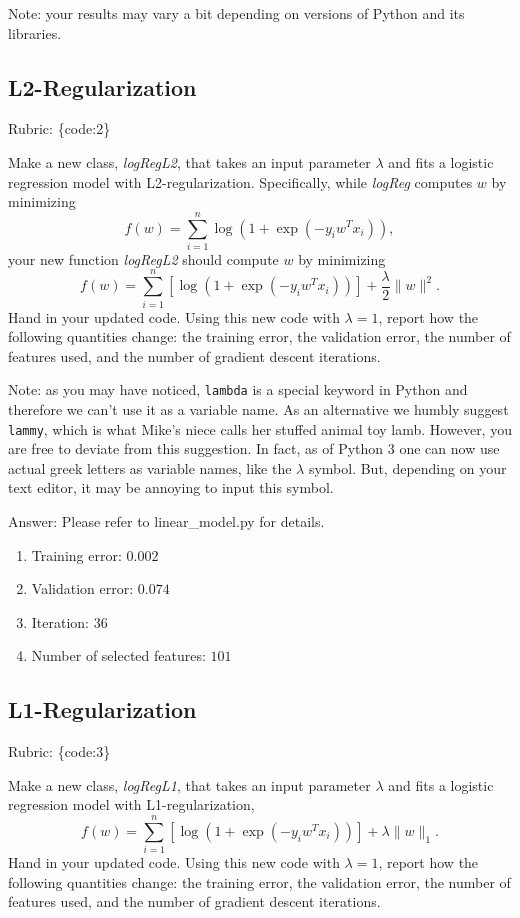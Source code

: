 \documentclass{article}
\def\rubric#1{\gre{Rubric: \{#1\}}}{}
\def\blu#1{{\color{blu}#1}}
\def\gre#1{{\color{gre}#1}}
\def\norm#1{\|#1\|}
\begin{document}
Note: your results may vary a bit depending on versions of Python and its libraries.


\subsection{L2-Regularization}
\rubric{code:2}

Make a new class, \emph{logRegL2}, that takes an input parameter $\lambda$ and fits a logistic regression model with L2-regularization. Specifically, while \emph{logReg} computes $w$ by minimizing
\[
f(w) = \sum_{i=1}^n \log(1+\exp(-y_iw^Tx_i)),
\]
your new function \emph{logRegL2} should compute $w$ by minimizing
\[
f(w) = \sum_{i=1}^n \left[\log(1+\exp(-y_iw^Tx_i))\right] + \frac{\lambda}{2}\norm{w}^2.
\]
\blu{Hand in your updated code. Using this new code with $\lambda = 1$, report how the following quantities change: the training error, the validation error, the number of features used, and the number of gradient descent iterations.}

Note: as you may have noticed, \texttt{lambda} is a special keyword in Python and therefore we can't use it as a variable name.
As an alternative we humbly suggest \texttt{lammy}, which is what Mike's niece calls her stuffed animal toy lamb.
However, you are free to deviate from this suggestion. In fact, as of Python 3 one can now use actual greek letters as variable names, like the $\lambda$ symbol. But, depending on your text editor, it may be annoying to input this symbol.

\gre{
Answer:
Please refer to linear\_model.py for details.
\begin{enumerate}
    \item Training error: $0.002$
    \item Validation error: $0.074$
    \item Iteration: $36$
    \item Number of selected features: $101$
\end{enumerate}
}


\subsection{L1-Regularization}
\rubric{code:3}

Make a new class, \emph{logRegL1}, that takes an input parameter $\lambda$ and fits a logistic regression model with L1-regularization,
\[
f(w) = \sum_{i=1}^n \left[\log(1+\exp(-y_iw^Tx_i))\right] + \lambda\norm{w}_1.
\]
\blu{Hand in your updated code. Using this new code with $\lambda = 1$, report how the following quantities change: the training error, the validation error, the number of features used, and the number of gradient descent iterations.}
\end{document}
